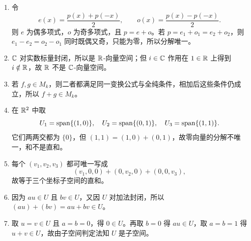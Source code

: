 \begin{enumerate}[label=\textbf{\arabic*.},start=21]
\item 令 \[
e(x)=\frac{p(x)+p(-x)}2, \qquad
o(x)=\frac{p(x)-p(-x)}2. \]
则 $e$ 为偶多项式，$o$ 为奇多项式，且 $p=e+o$。若 $p=e_1+o_1=e_2+o_2$，则 $e_1-e_2=o_2-o_1$ 同时既偶又奇，只能为零，所以分解唯一。 \item $\mathbb{C}$ 对实数标量封闭，所以是 $\mathbb{R}$-向量空间；但 $i\in\mathbb{C}$ 作用在 $1\in\mathbb{R}$ 上得到 $i\notin\mathbb{R}$，故 $\mathbb{R}$ 不是 $\mathbb{C}$-向量空间。
\item 若 $f,g\in M_k$，则二者都满足同一变换公式与全纯条件，相加后这些条件仍成立，所以 $f+g\in M_k$。 \item 在 $\mathbb{R}^2$ 中取
\[ U_1=\operatorname{span}\{(1,0)\},\quad U_2=\operatorname{span}\{(0,1)\},\quad U_3=\operatorname{span}\{(1,1)\}.
\] 它们两两交都为 $\{0\}$，但 $(1,1)=(1,0)+(0,1)$，故零向量的分解不唯一，和不是直和。
\item 每个 $(v_1,v_2,v_3)$ 都可唯一写成 \[
(v_1,0,0)+(0,v_2,0)+(0,0,v_3), \]
故等于三个坐标子空间的直和。 \item 因为 $au\in U$ 且 $bv\in U$，又因 $U$ 对加法封闭，所以 $(au)+(bv)=au+bv\in U$。
\item 取 $u=v\in U$ 且 $a=b=0$，得 $0\in U$。再取 $b=0$ 得 $au\in U$，取 $a=b=1$ 得 $u+v\in U$，故由子空间判定法知 $U$ 是子空间。 \end{enumerate}

